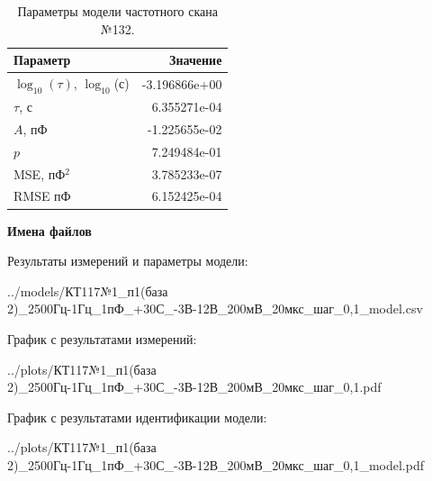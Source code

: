 \begin{table}[!ht]
    \centering
    \caption{Параметры модели частотного скана №132.}
    \begin{tabular}{|l|r|}
        \hline
        Параметр                                       & Значение                  \\ \hline
        $\log_{10}(\tau)$, $\log_{10}$(с)              & -3.196866e+00             \\ \hline
        $\tau$, с                                      & 6.355271e-04              \\ \hline
        $A$, пФ                                        & -1.225655e-02             \\ \hline
        $p$                                            & 7.249484e-01              \\ \hline
        MSE, пФ$^2$                                    & 3.785233e-07              \\ \hline
        RMSE пФ                                        & 6.152425e-04              \\ \hline
    \end{tabular}
    \label{table:frequency_scan_model_132}
\end{table}

\textbf{Имена файлов}

Результаты измерений и параметры модели:

\scriptsize../models/КТ117№1\_п1(база 2)\_2500Гц-1Гц\_1пФ\_+30С\_-3В-12В\_200мВ\_20мкс\_шаг\_0,1\_model.csv
\normalsize

График с результатами измерений:

\scriptsize../plots/КТ117№1\_п1(база 2)\_2500Гц-1Гц\_1пФ\_+30С\_-3В-12В\_200мВ\_20мкс\_шаг\_0,1.pdf
\normalsize

График с результатами идентификации модели:

\scriptsize../plots/КТ117№1\_п1(база 2)\_2500Гц-1Гц\_1пФ\_+30С\_-3В-12В\_200мВ\_20мкс\_шаг\_0,1\_model.pdf
\normalsize

